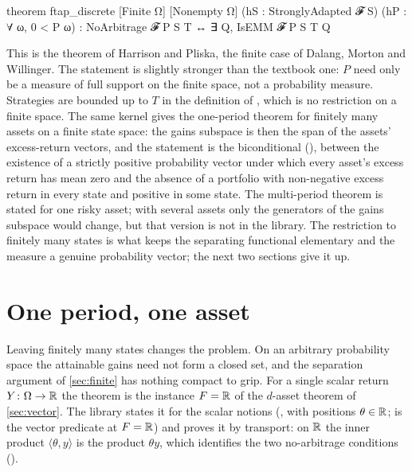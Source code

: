 \documentclass[11pt]{article}
\begin{document}
\begin{leancode}[caption={The finite-state theorem (\texttt{Foundations/FTAPDiscrete}). $\Omega$ is \texttt{Finite} and \texttt{Nonempty} with \texttt{MeasurableSingletonClass}, $\mathcal{F}$ a filtration indexed by $\mathbb{N}$, $P$ a measure, $S:\mathbb{N}\to\Omega\to\mathbb{R}$.},label=lst:discrete]
theorem ftap_discrete [Finite Ω] [Nonempty Ω]
    (hS : StronglyAdapted 𝓕 S) (hP : ∀ ω, 0 < P {ω}) :
    NoArbitrage 𝓕 P S T ↔ ∃ Q, IsEMM 𝓕 P S T Q
\end{leancode}

This is the theorem of Harrison and Pliska, the finite case of Dalang, Morton and Willinger. The
statement is slightly stronger than the textbook one: $P$ need only be a measure of full support on the
finite space, not a probability measure. Strategies are bounded up to $T$ in the definition of
, which is no restriction on a finite space. The same
kernel gives the one-period theorem for finitely many assets on a finite state space: the gains
subspace is then the span of the assets' excess-return vectors, and the statement is the biconditional
 (), between the existence of
a strictly positive probability vector under which every asset's excess return has mean zero and the absence of a
portfolio with non-negative excess return in every state and positive in some state. The multi-period theorem
is stated for one risky asset; with several assets only the generators of the gains subspace would
change, but that version is not in the library. The restriction to finitely many states is what keeps
the separating functional elementary and the measure a genuine probability vector; the next two
sections give it up.

\section{One period, one asset}\label{sec:scalar}

Leaving finitely many states changes the problem. On an arbitrary probability space the attainable gains
need not form a closed set, and the separation argument of \cref{sec:finite} has nothing compact to
grip. For a single scalar return $Y\colon\Omega\to\mathbb{R}$ the theorem is the instance $F=\mathbb{R}$ of the $d$-asset
theorem of \cref{sec:vector}. The library states it for the scalar notions
(, with positions $\theta\in\mathbb{R}$;  is the vector predicate
at $F=\mathbb{R}$) and proves it by transport: on $\mathbb{R}$ the inner product $\langle\theta,y\rangle$ is the product $\theta y$, which
identifies the two no-arbitrage conditions ().
\end{document}
